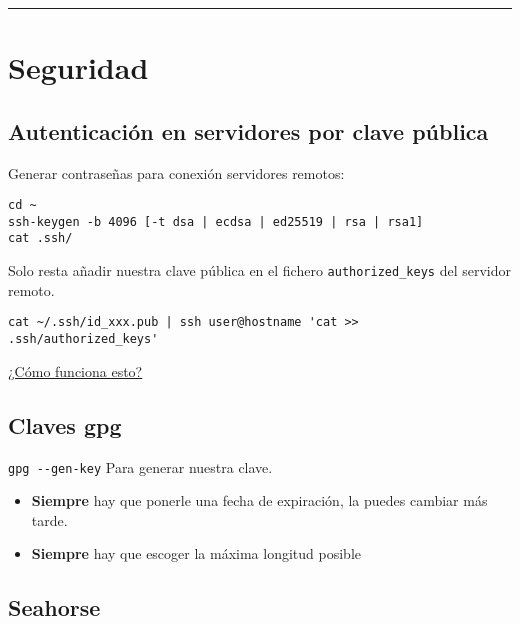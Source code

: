 \documentclass[
  12pt,
  spanish,
]{article}
\providecommand{\tightlist}{%
  \setlength{\itemsep}{0pt}\setlength{\parskip}{0pt}}
\begin{document}
\begin{center}\rule{0.5\linewidth}{\linethickness}\end{center}

\hypertarget{seguridad}{%
\section{Seguridad}\label{seguridad}}

\hypertarget{autenticaciuxf3n-en-servidores-por-clave-puxfablica}{%
\subsection{Autenticación en servidores por clave
pública}\label{autenticaciuxf3n-en-servidores-por-clave-puxfablica}}

Generar contraseñas para conexión servidores remotos:

\begin{verbatim}
cd ~
ssh-keygen -b 4096 [-t dsa | ecdsa | ed25519 | rsa | rsa1]
cat .ssh/
\end{verbatim}

Solo resta añadir nuestra clave pública en el fichero
\texttt{authorized\_keys} del servidor remoto.

\begin{verbatim}
cat ~/.ssh/id_xxx.pub | ssh user@hostname 'cat >> .ssh/authorized_keys'
\end{verbatim}

\href{https://www.digitalocean.com/community/tutorials/understanding-the-ssh-encryption-and-connection-process}{¿Cómo
funciona esto?}

\hypertarget{claves-gpg}{%
\subsection{Claves gpg}\label{claves-gpg}}

\texttt{gpg\ -\/-gen-key} Para generar nuestra clave.

\begin{itemize}
\tightlist
\item
  \textbf{Siempre} hay que ponerle una fecha de expiración, la puedes
  cambiar más tarde.
\item
  \textbf{Siempre} hay que escoger la máxima longitud posible
\end{itemize}

\hypertarget{seahorse}{%
\subsection{Seahorse}\label{seahorse}}
\end{document}
